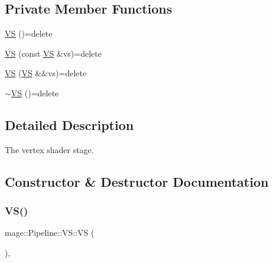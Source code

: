 \subsection*{Private Member Functions}
\begin{DoxyCompactItemize}
\item 
\hyperlink{structmage_1_1_pipeline_1_1_v_s_a301b04c9bed295586758592d405adcb9}{VS} ()=delete
\item 
\hyperlink{structmage_1_1_pipeline_1_1_v_s_a7c0ef1e66b9460c2ea8e4fd5a8f70cda}{VS} (const \hyperlink{structmage_1_1_pipeline_1_1_v_s}{VS} \&vs)=delete
\item 
\hyperlink{structmage_1_1_pipeline_1_1_v_s_a840a4f523baf72269b5219608d4f7471}{VS} (\hyperlink{structmage_1_1_pipeline_1_1_v_s}{VS} \&\&vs)=delete
\item 
\hyperlink{structmage_1_1_pipeline_1_1_v_s_aa55ab6d19a4351125189cca2a5c2412e}{$\sim$\+VS} ()=delete
\end{DoxyCompactItemize}


\subsection{Detailed Description}
The vertex shader stage. 

\subsection{Constructor \& Destructor Documentation}
\hypertarget{structmage_1_1_pipeline_1_1_v_s_a301b04c9bed295586758592d405adcb9}{}\label{structmage_1_1_pipeline_1_1_v_s_a301b04c9bed295586758592d405adcb9} 
\subsubsection{\texorpdfstring{V\+S()}{VS()}\hspace{0.1cm}{\footnotesize\ttfamily [1/3]}}
{\footnotesize\ttfamily mage\+::\+Pipeline\+::\+V\+S\+::\+VS (\begin{DoxyParamCaption}{ }\end{DoxyParamCaption})\hspace{0.3cm}{\ttfamily [private]}, {\ttfamily [delete]}}

\hypertarget{structmage_1_1_pipeline_1_1_v_s_a7c0ef1e66b9460c2ea8e4fd5a8f70cda}{}\label{structmage_1_1_pipeline_1_1_v_s_a7c0ef1e66b9460c2ea8e4fd5a8f70cda} 
